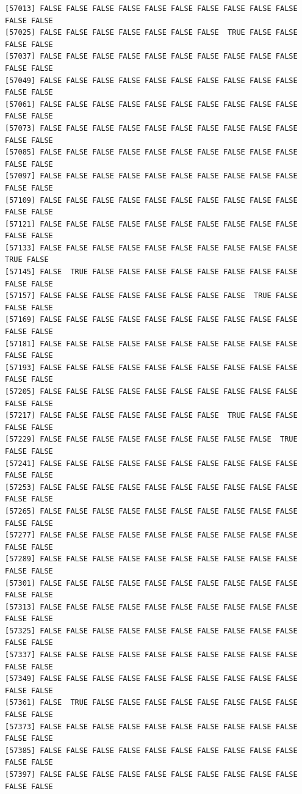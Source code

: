 \documentclass[
  a4paper,
  DIV=11,
  numbers=noendperiod]{scrartcl}
\begin{document}
\begin{verbatim}
[57013] FALSE FALSE FALSE FALSE FALSE FALSE FALSE FALSE FALSE FALSE FALSE FALSE
[57025] FALSE FALSE FALSE FALSE FALSE FALSE FALSE  TRUE FALSE FALSE FALSE FALSE
[57037] FALSE FALSE FALSE FALSE FALSE FALSE FALSE FALSE FALSE FALSE FALSE FALSE
[57049] FALSE FALSE FALSE FALSE FALSE FALSE FALSE FALSE FALSE FALSE FALSE FALSE
[57061] FALSE FALSE FALSE FALSE FALSE FALSE FALSE FALSE FALSE FALSE FALSE FALSE
[57073] FALSE FALSE FALSE FALSE FALSE FALSE FALSE FALSE FALSE FALSE FALSE FALSE
[57085] FALSE FALSE FALSE FALSE FALSE FALSE FALSE FALSE FALSE FALSE FALSE FALSE
[57097] FALSE FALSE FALSE FALSE FALSE FALSE FALSE FALSE FALSE FALSE FALSE FALSE
[57109] FALSE FALSE FALSE FALSE FALSE FALSE FALSE FALSE FALSE FALSE FALSE FALSE
[57121] FALSE FALSE FALSE FALSE FALSE FALSE FALSE FALSE FALSE FALSE FALSE FALSE
[57133] FALSE FALSE FALSE FALSE FALSE FALSE FALSE FALSE FALSE FALSE  TRUE FALSE
[57145] FALSE  TRUE FALSE FALSE FALSE FALSE FALSE FALSE FALSE FALSE FALSE FALSE
[57157] FALSE FALSE FALSE FALSE FALSE FALSE FALSE FALSE  TRUE FALSE FALSE FALSE
[57169] FALSE FALSE FALSE FALSE FALSE FALSE FALSE FALSE FALSE FALSE FALSE FALSE
[57181] FALSE FALSE FALSE FALSE FALSE FALSE FALSE FALSE FALSE FALSE FALSE FALSE
[57193] FALSE FALSE FALSE FALSE FALSE FALSE FALSE FALSE FALSE FALSE FALSE FALSE
[57205] FALSE FALSE FALSE FALSE FALSE FALSE FALSE FALSE FALSE FALSE FALSE FALSE
[57217] FALSE FALSE FALSE FALSE FALSE FALSE FALSE  TRUE FALSE FALSE FALSE FALSE
[57229] FALSE FALSE FALSE FALSE FALSE FALSE FALSE FALSE FALSE  TRUE FALSE FALSE
[57241] FALSE FALSE FALSE FALSE FALSE FALSE FALSE FALSE FALSE FALSE FALSE FALSE
[57253] FALSE FALSE FALSE FALSE FALSE FALSE FALSE FALSE FALSE FALSE FALSE FALSE
[57265] FALSE FALSE FALSE FALSE FALSE FALSE FALSE FALSE FALSE FALSE FALSE FALSE
[57277] FALSE FALSE FALSE FALSE FALSE FALSE FALSE FALSE FALSE FALSE FALSE FALSE
[57289] FALSE FALSE FALSE FALSE FALSE FALSE FALSE FALSE FALSE FALSE FALSE FALSE
[57301] FALSE FALSE FALSE FALSE FALSE FALSE FALSE FALSE FALSE FALSE FALSE FALSE
[57313] FALSE FALSE FALSE FALSE FALSE FALSE FALSE FALSE FALSE FALSE FALSE FALSE
[57325] FALSE FALSE FALSE FALSE FALSE FALSE FALSE FALSE FALSE FALSE FALSE FALSE
[57337] FALSE FALSE FALSE FALSE FALSE FALSE FALSE FALSE FALSE FALSE FALSE FALSE
[57349] FALSE FALSE FALSE FALSE FALSE FALSE FALSE FALSE FALSE FALSE FALSE FALSE
[57361] FALSE  TRUE FALSE FALSE FALSE FALSE FALSE FALSE FALSE FALSE FALSE FALSE
[57373] FALSE FALSE FALSE FALSE FALSE FALSE FALSE FALSE FALSE FALSE FALSE FALSE
[57385] FALSE FALSE FALSE FALSE FALSE FALSE FALSE FALSE FALSE FALSE FALSE FALSE
[57397] FALSE FALSE FALSE FALSE FALSE FALSE FALSE FALSE FALSE FALSE FALSE FALSE

\end{verbatim}
\end{document}
